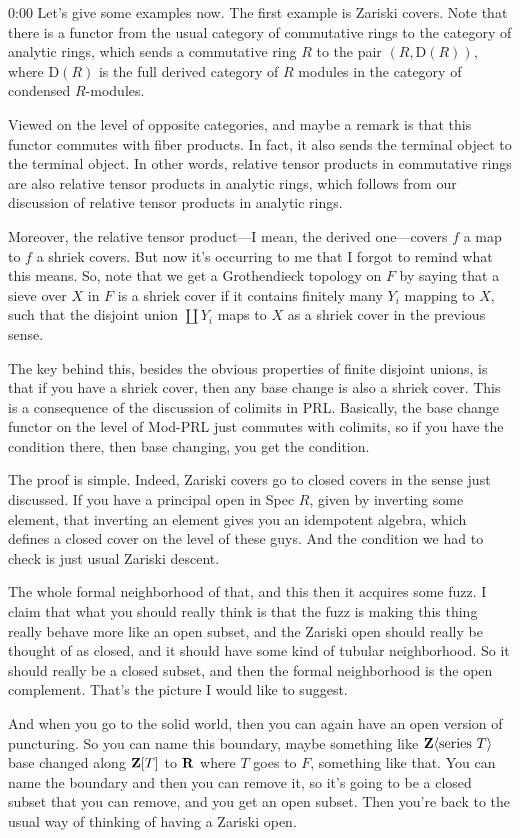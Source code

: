 \begin{unfinished}{0:00}
Let's give some examples now. The first example is Zariski covers. Note that there is a functor from the usual category of commutative rings to the category of analytic rings, which sends a commutative ring $R$ to the pair $(R, \mathrm{D}(R))$, where $\mathrm{D}(R)$ is the full derived category of $R$ modules in the category of condensed $R$-modules.

Viewed on the level of opposite categories, and maybe a remark is that this functor commutes with fiber products. In fact, it also sends the terminal object to the terminal object. In other words, relative tensor products in commutative rings are also relative tensor products in analytic rings, which follows from our discussion of relative tensor products in analytic rings. 

Moreover, the relative tensor product---I mean, the derived one---covers $f$ a map to $f$ a shriek covers. But now it's occurring to me that I forgot to remind what this means. So, note that we get a Grothendieck topology on $F$ by saying that a sieve over $X$ in $F$ is a shriek cover if it contains finitely many $Y_i$ mapping to $X$, such that the disjoint union $\coprod Y_i$ maps to $X$ as a shriek cover in the previous sense.

The key behind this, besides the obvious properties of finite disjoint unions, is that if you have a shriek cover, then any base change is also a shriek cover. This is a consequence of the discussion of colimits in PRL. Basically, the base change functor on the level of Mod-PRL just commutes with colimits, so if you have the condition there, then base changing, you get the condition. 

The proof is simple. Indeed, Zariski covers go to closed covers in the sense just discussed. If you have a principal open in Spec $R$, given by inverting some element, that inverting an element gives you an idempotent algebra, which defines a closed cover on the level of these guys. And the condition we had to check is just usual Zariski descent.


The whole formal neighborhood of that, and this then it acquires some fuzz. I claim that what you should really think is that the fuzz is making this thing really behave more like an open subset, and the Zariski open should really be thought of as closed, and it should have some kind of tubular neighborhood. So it should really be a closed subset, and then the formal neighborhood is the open complement. That's the picture I would like to suggest.

And when you go to the solid world, then you can again have an open version of puncturing. So you can name this boundary, maybe something like $\mathbf Z\langle\text{series } T\rangle$ base changed along $\mathbf Z[T]$ to $\mathbf R$ where $T$ goes to $F$, something like that. You can name the boundary and then you can remove it, so it's going to be a closed subset that you can remove, and you get an open subset. Then you're back to the usual way of thinking of having a Zariski open.


\end{unfinished}

